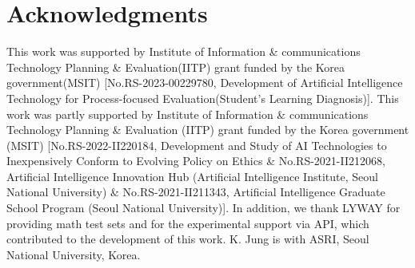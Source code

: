 \documentclass[letterpaper]{article} %
\begin{document}
\section{Acknowledgments}
% 
This work was supported by Institute of Information \& communications Technology Planning \& Evaluation(IITP) grant funded by the Korea government(MSIT) [No.RS-2023-00229780, Development of Artificial Intelligence Technology for Process-focused Evaluation(Student’s Learning Diagnosis)]. This work was partly supported by Institute of Information \& communications Technology Planning \& Evaluation (IITP) grant funded by the Korea government (MSIT) [No.RS-2022-II220184, Development and Study of AI Technologies to Inexpensively Conform to Evolving Policy on Ethics \& No.RS-2021-II212068, Artificial Intelligence Innovation Hub (Artificial Intelligence Institute, Seoul National University) \& No.RS-2021-II211343, Artificial Intelligence Graduate School Program (Seoul National University)]. In addition, we thank LYWAY for providing math test sets and for the experimental support via API, which contributed to the development of this work. K. Jung is with ASRI, Seoul National University, Korea.







\end{document}
